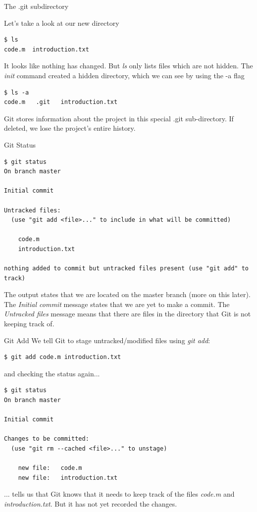 \documentclass[10pt]{beamer}
\begin{document}
\begin{frame}[fragile]{The .git subdirectory}

Let's take a look at our new directory
\begin{lstlisting}
$ ls
code.m	introduction.txt
\end{lstlisting}
It looks like nothing has changed. But \emph{ls} only lists files which are not hidden. The \emph{init} command created a hidden directory, which we can see by using the -a flag
\begin{lstlisting}
$ ls -a
code.m	 .git	introduction.txt
\end{lstlisting}
Git stores information about the project in this special .git sub-directory. If deleted, we lose the project's entire history.\\

\end{frame}

\begin{frame}[fragile]{Git Status}

\begin{lstlisting}
$ git status
On branch master

Initial commit

Untracked files:
  (use "git add <file>..." to include in what will be committed)

	code.m
	introduction.txt

nothing added to commit but untracked files present (use "git add" to track)
\end{lstlisting}
The output states that we are located on the master branch (more on this later). The \emph{Initial commit} message states that we are yet to make a commit. The \emph{Untracked files} message means that there are files in the directory that Git is not keeping track of.
\end{frame}

\begin{frame}[fragile]{Git Add}
We tell Git to stage untracked/modified files using \emph{git add}:

\begin{lstlisting}
$ git add code.m introduction.txt
\end{lstlisting}
and checking the status again...
\begin{lstlisting}
$ git status
On branch master

Initial commit

Changes to be committed:
  (use "git rm --cached <file>..." to unstage)

	new file:   code.m
	new file:   introduction.txt
\end{lstlisting}
... tells us that Git knows that it needs to keep track of the files \emph{code.m} and \emph{introduction.txt}. But it has not yet recorded the changes. 

\end{frame}
\end{document}
